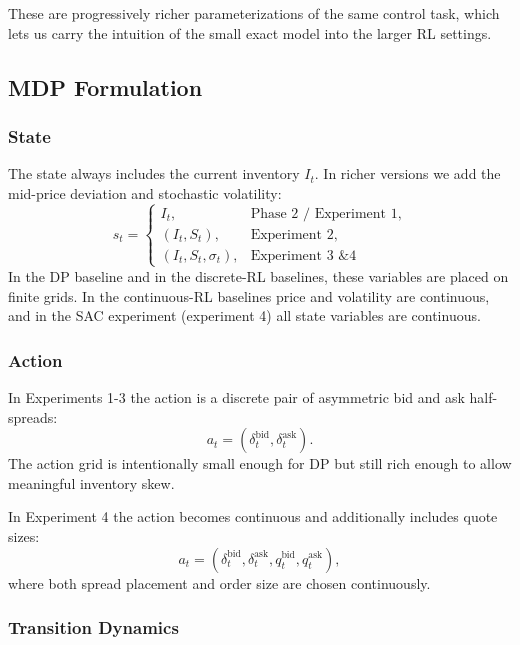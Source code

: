 \documentclass[11pt,a4paper]{article}
\begin{document}
These are progressively richer parameterizations of the same control task, which lets us carry the intuition of the small exact model into the larger RL settings.

\subsection{MDP Formulation}

\subsubsection{State}

The state always includes the current inventory $I_t$. In richer versions we add the mid-price deviation and stochastic volatility:
\begin{equation}
    s_t =
    \begin{cases}
        I_t, & \text{Phase 2 / Experiment 1}, \\
        (I_t, S_t), & \text{Experiment 2}, \\
        (I_t, S_t, \sigma_t), & \text{Experiment 3 \& 4}
    \end{cases}
\end{equation}
In the DP baseline and in the discrete-RL baselines, these variables are placed on finite grids. In the continuous-RL baselines price and volatility are continuous, and in the SAC experiment (experiment 4) all state variables are continuous.

\subsubsection{Action}

In Experiments 1-3 the action is a discrete pair of asymmetric bid and ask half-spreads:
\begin{equation}
    a_t = (\delta_t^{\mathrm{bid}}, \delta_t^{\mathrm{ask}}).
\end{equation}
The action grid is intentionally small enough for DP but still rich enough to allow meaningful inventory skew.

In Experiment 4 the action becomes continuous and additionally includes quote sizes:
\begin{equation}
    a_t = (\delta_t^{\mathrm{bid}}, \delta_t^{\mathrm{ask}}, q_t^{\mathrm{bid}}, q_t^{\mathrm{ask}}),
\end{equation}
where both spread placement and order size are chosen continuously.

\subsubsection{Transition Dynamics}
\end{document}
